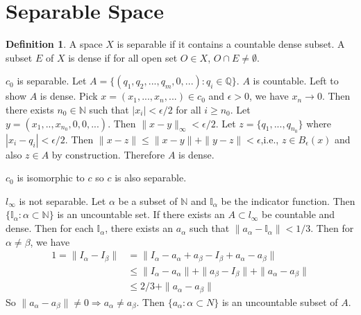 \documentclass[a4paper, 11pt]{article}
\newcommand{\Q}{\mathbb{Q}}
\newcommand{\N}{\mathbb{N}}
\theoremstyle{definition}
\newtheorem{definition}[theorem]{Definition}
\begin{document}
\section{Separable Space}
\begin{definition}
A space $X$ is separable if it contains a countable dense subset. A subset $E$ of $X$ is dense if for all open set $O\in X$, $O \cap E\neq \emptyset$.
\end{definition}
$c_0$ is separable. Let $A=\{(q_1,q_2,...,q_m,0,...): q_i \in \Q\}$. $A$ is countable. Left to show $A$ is dense. Pick $x=(x_1,...,x_n,...)\in c_0$ and $\epsilon>0$, we have
$x_n\to 0$. Then there exists $n_0\in \N$ such that $|x_i|<\epsilon/2$ for all $i\ge n_0$. Let $y=(x_1,..,x_{n_0},0,0,...)$. Then $\|x-y\|_\infty < \epsilon/2$. Let $z=\{q_1,...,q_{n_0}\}$ where 
$|x_i-q_i|<\epsilon/2$. Then $\|x-z\|\le\|x-y\|+\|y-z\|<\epsilon$,i.e., $z\in B_\epsilon(x)$ and also $z\in A$ by construction. Therefore $A$ is dense.

$c_0$ is isomorphic to $c$ so $c$ is also separable.

$l_\infty$ is not separable. Let $\alpha$ be a subset of $\N$ and $\mathbb I_\alpha$ be the indicator function. Then $\{\mathbb I_\alpha: \alpha\subset \N\}$ is an 
uncountable set. If there exists an $A\subset l_\infty$ be countable and dense. Then for each $\mathbb I_\alpha$, there exists an $a_\alpha$ such that 
$\|a_\alpha-\mathbb I_\alpha\|<1/3$. Then for $\alpha\neq \beta$, we have
\begin{align*}
    1=\|I_\alpha-I_\beta\|&=\|I_\alpha-a_\alpha+a_\beta - I_\beta+a_\alpha-a_\beta\|\\
    &\le \|I_\alpha-a_\alpha\| + \|a_\beta - I_\beta\|+\|a_\alpha-a_\beta\|\\
    &\le 2/3 + \|a_\alpha-a_\beta\|
\end{align*}
So $\|a_\alpha-a_\beta\|\neq 0 \Rightarrow a_\alpha\neq a_\beta$. Then $\{a_\alpha: \alpha \subset N\}$ is an uncountable subset of $A$.
\end{document}
